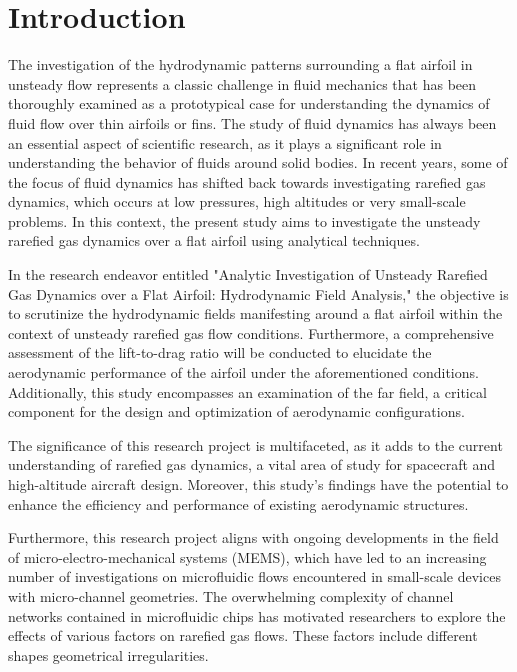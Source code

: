 \chapter{Introduction}
The investigation of the hydrodynamic patterns surrounding a flat airfoil in unsteady flow represents a classic challenge in fluid mechanics that has been thoroughly examined as a prototypical case for understanding the dynamics of fluid flow over thin airfoils or fins\cite{gombosi1994gaskinetic, abramov2020rarefied, liu2021aerodynamic}. The study of fluid dynamics has always been an essential aspect of scientific research, as it plays a significant role in understanding the behavior of fluids around solid bodies. In recent years, some of the focus of fluid dynamics has shifted back towards investigating rarefied gas dynamics\cite{sazhin2023rarefied,jha2023heat}, which occurs at low pressures, high altitudes or very small-scale problems. In this context, the present study aims to investigate the unsteady rarefied gas dynamics over a flat airfoil using analytical techniques.

In the research endeavor entitled "Analytic Investigation of Unsteady Rarefied Gas Dynamics over a Flat Airfoil: Hydrodynamic Field Analysis," the objective is to scrutinize the hydrodynamic fields manifesting around a flat airfoil within the context of unsteady rarefied gas flow conditions. Furthermore, a comprehensive assessment of the lift-to-drag ratio will be conducted to elucidate the aerodynamic performance of the airfoil under the aforementioned conditions. Additionally, this study encompasses an examination of the far field, a critical component for the design and optimization of aerodynamic configurations.

The significance of this research project is multifaceted, as it adds to the current understanding of rarefied gas dynamics, a vital area of study for spacecraft and high-altitude aircraft design. Moreover, this study's findings have the potential to enhance the efficiency and performance of existing aerodynamic structures.

Furthermore, this research project aligns with ongoing developments in the field of micro-electro-mechanical systems (MEMS), which have led to an increasing number of investigations\cite{kirby2010micro, berthier2010microfluidics, chakraborty2012microfluidics, karniadakis2006microflows} on microfluidic flows encountered in small-scale devices with micro-channel geometries. The overwhelming complexity of channel networks contained in microfluidic chips has motivated researchers to explore the effects of various factors on rarefied gas flows. These factors include different shapes geometrical irregularities.

